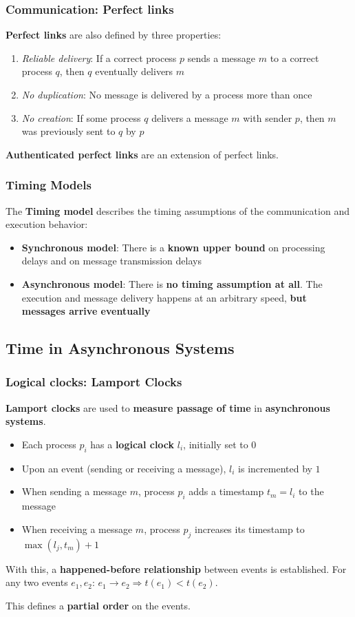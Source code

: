 \documentclass[12pt,A4]{extarticle}
\newcommand{\highlight}[1]{\textcolor{highlightColor}{\textbf{#1}}}
\begin{document}
\subsubsection{Communication: Perfect links}\label{sec:perfectLinks}
\textbf{Perfect links} are also defined by three properties:
\begin{enumerate}
  \item{\textit{Reliable delivery}: If a correct process $p$ sends a message $m$ to a correct process $q$, then $q$ eventually delivers $m$}
  \item{\textit{No duplication}: No message is delivered by a process more than once}
  \item{\textit{No creation}: If some process $q$ delivers a message $m$ with sender $p$, then $m$ was previously sent to $q$ by $p$}
\end{enumerate}
\textbf{Authenticated perfect links} are an extension of perfect links.

\subsubsection{Timing Models}
The \highlight{Timing model} describes the timing assumptions of the communication and execution behavior:
\begin{itemize}
  \item{\highlight{Synchronous model}: There is a \textbf{known upper bound} on processing delays and on message transmission delays}
  \item{\highlight{Asynchronous model}: There is \textbf{no timing assumption at all}. The execution and message delivery happens at an arbitrary speed, \textbf{but messages arrive eventually}}
\end{itemize}

\subsection{Time in Asynchronous Systems}
\subsubsection{Logical clocks: Lamport Clocks}
\highlight{Lamport clocks} are used to \textbf{measure passage of time} in \textbf{asynchronous systems}.
\begin{itemize}
  \item{Each process $p_i$ has a \textbf{logical clock} $l_i$, initially set to $0$}
  \item{Upon an event (sending or receiving a message), $l_i$ is incremented by $1$}
  \item{When sending a message $m$, process $p_i$ adds a timestamp $t_m = l_i$ to the message}
  \item{When receiving a message $m$, process $p_j$ increases its timestamp to $\max(l_j, t_m) + 1$}
\end{itemize}
With this, a \textbf{happened-before relationship} between events is established. For any two events $e_1, e_2$: $e_1 \rightarrow e_2 \Rightarrow t(e_1) < t(e_2)$.\par
This defines a \textbf{partial order} on the events.
\end{document}
